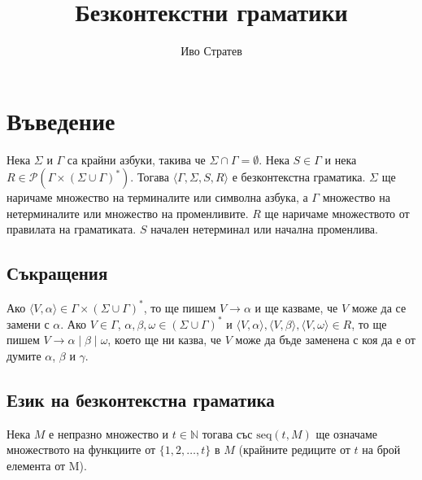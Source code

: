 \documentclass[12pt]{article}
\title{Безконтекстни граматики}
\author{Иво Стратев}
\begin{document}
\maketitle

\section*{Въведение}
Нека \(\Sigma\) и \(\Gamma\) са крайни азбуки, такива че \(\Sigma \cap \Gamma = \emptyset\).
Нека \(S \in \Gamma\) и нека \(R \in \mathcal{P}(\Gamma \times (\Sigma \cup \Gamma)^* )\).
Тогава \(\langle \Gamma,  \Sigma, S, R\rangle\) е безконтекстна граматика.
\(\Sigma\) ще наричаме множество на терминалите или символна азбука,
а \(\Gamma\) множество на нетерминалите или множество на променливите.
\(R\) ще наричаме множеството от правилата на граматиката.
\(S\) начален нетерминал или начална променлива.


\subsection*{Съкращения}
Ако \(\langle V, \alpha \rangle \in \Gamma \times (\Sigma \cup \Gamma)^*\), то ще пишем \(V \to \alpha\)
и ще казваме, че \(V\) може да се замени с \(\alpha\). Ако \(V \in \Gamma\), \(\alpha, \beta, \omega \in (\Sigma \cup \Gamma)^*\) и \(\langle V, \alpha \rangle, \langle V, \beta \rangle, \langle V, \omega \rangle \in R\), то ще пишем \(V \to \alpha \mid \beta \mid \omega \),
което ще ни казва, че \(V\) може да бъде заменена с коя да е от думите \(\alpha\), \(\beta\) и \(\gamma\).

\subsection*{Език на безконтекстна граматика}

\par Нека \(M\) е непразно множество и \(t \in \mathbb{N}\) тогава със \(\mathrm{seq}(t, M)\) ще означаме множеството на функциите от \(\{1, 2, \dots, t\}\) в \(M\) (крайните редиците от \(t\) на брой елемента от M).
\end{document}
